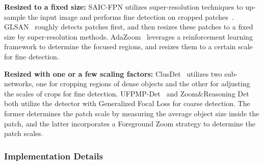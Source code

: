 \documentclass[letterpaper]{article} %
\newcommand\rjf[1]{\textcolor{red}{\{RJF: #1\}}}
\begin{document}
\sloppy \noindent \textbf{Resized to a fixed size:}
SAIC-FPN utilizes super-resolution techniques to up-sample the input image and performs fine detection on cropped patches~\cite{Zhou_2019_SAICFPN}. GLSAN~\cite{Deng_2021_GLSAN} roughly detects patches first, and then resizes these patches to a fixed size by super-resolution methods.
AdaZoom~\cite{Xu_2022_AdaZoom} leverages a reinforcement learning framework to determine the focused regions, and resizes them to a certain scale for fine detection.

\sloppy \noindent \textbf{Resized with one or a few scaling factors:}
ClusDet~\cite{Yang_2019_Clustered} utilizes two sub-networks, one for cropping regions of dense objects and the other for adjusting the scales of crops for fine detection.
UFPMP-Det~\cite{Huang_2022_UFPMP} and Zoom\&Reasoning Det~\cite{Ge_2022_ZoomAndReasoning} both utilize the detector with Generalized Focal Loss \cite{Li_2020_GFL} for coarse detection.
The former determines the patch scale by measuring the average object size inside the patch, and the latter incorporates a Foreground Zoom strategy to determine the patch scales.




\subsubsection{Implementation Details}
\label{sssec:implementationDetails}
\end{document}
